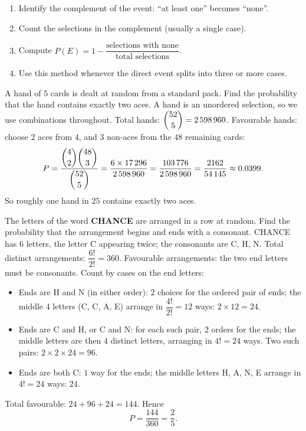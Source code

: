 \documentclass[11pt]{article}
\begin{document}
\begin{methode}
\begin{enumerate}
\item Identify the complement of the event: ``at least one'' becomes ``none''.
\item Count the selections in the complement (usually a single case).
\item Compute $P(E)=1-\dfrac{\text{selections with none}}{\text{total selections}}$.
\item Use this method whenever the direct event splits into three or more cases.
\end{enumerate}
\end{methode}

\begin{exoresolu}
A hand of $5$ cards is dealt at random from a standard pack. Find the probability that the hand contains exactly two aces.
\tcblower
A hand is an unordered selection, so we use combinations throughout. Total hands: $\dbinom{52}{5}=2\,598\,960$.
Favourable hands: choose $2$ aces from $4$, and $3$ non-aces from the $48$ remaining cards:
\[ P=\frac{\dbinom{4}{2}\dbinom{48}{3}}{\dbinom{52}{5}}=\frac{6\times 17\,296}{2\,598\,960}=\frac{103\,776}{2\,598\,960}=\frac{2162}{54\,145}\approx 0.0399. \]
So roughly one hand in $25$ contains exactly two aces.
\end{exoresolu}

\begin{exoresolu}
The letters of the word \textbf{CHANCE} are arranged in a row at random. Find the probability that the arrangement begins and ends with a consonant.
\tcblower
CHANCE has $6$ letters, the letter C appearing twice; the consonants are C, H, N. Total distinct arrangements: $\dfrac{6!}{2!}=360$.
Favourable arrangements: the two end letters must be consonants. Count by cases on the end letters:
\begin{itemize}
\item Ends are H and N (in either order): $2$ choices for the ordered pair of ends; the middle $4$ letters (C, C, A, E) arrange in $\dfrac{4!}{2!}=12$ ways: $2\times 12 = 24$.
\item Ends are C and H, or C and N: for each such pair, $2$ orders for the ends; the middle letters are then $4$ distinct letters, arranging in $4! = 24$ ways. Two such pairs: $2\times 2\times 24 = 96$.
\item Ends are both C: $1$ way for the ends; the middle letters H, A, N, E arrange in $4!=24$ ways: $24$.
\end{itemize}
Total favourable: $24+96+24=144$. Hence
\[ P=\frac{144}{360}=\frac{2}{5}. \]
\end{exoresolu}
\end{document}
